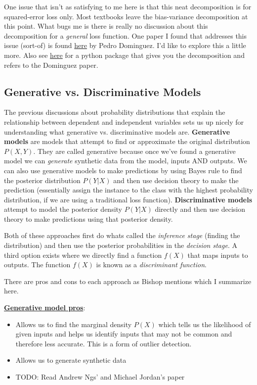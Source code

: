 One issue that isn't as satisfying to me here is that this neat decomposition is for squared-error loss only. Most textbooks leave the bias-variance decomposition at this point. What bugs me is there is really no discussion about this decomposition for a \emph{general} loss function. One paper I found that addresses this issue (sort-of) is found \href{https://homes.cs.washington.edu/~pedrod/bvd.pdf}{here} by Pedro Dominguez. I'd like to explore this a little more. Also see \href{https://github.com/rasbt/mlxtend/blob/master/docs/sources/user_guide/evaluate/bias_variance_decomp.ipynb?utm_campaign=Data_Elixir&utm_source=Data_Elixir_210}{here} for a python package that gives you the decomposition and refers to the Dominguez paper.




\subsection{Generative vs. Discriminative Models}

The previous discussions about probability distributions that explain the relationship between dependent and independent variables sets us up nicely for understanding what generative vs. discriminative models are. \textbf{Generative models} are models that attempt to find or approximate the original distribution $P(X,Y)$. They are called generative because once we've found a generative model we can \emph{generate} synthetic data from the model, inputs AND outputs. We can also use generative models to make predictions by using Bayes rule to find the posterior distribution $P(Y|X)$ and then use decision theory to make the prediction (essentially assign the instance to the class with the highest probability distribution, if we are using a traditional loss function). \textbf{Discriminative models} attempt to model the posterior density $P(Y|X)$ directly and then use decision theory to make predictions using that posterior density. 

Both of these approaches first do whats called the \emph{inference stage} (finding the distribution) and then use the posterior probabilities in the \emph{decision stage}. A third option exists where we directly find a function $f(X)$ that maps inputs to outputs. The function $f(X)$ is known as a \emph{discriminant function}.

There are pros and cons to each approach as Bishop mentions which I summarize here.
\break

\noindent \underline{\textbf{Generative model pros}}:
\begin{itemize}
\item Allows us to find the marginal density $P(X)$ which tells us the likelihood of given inputs and helps us identify inputs that may not be common and therefore less accurate. This is a form of outlier detection.
\item Allows us to generate synthetic data
\item TODO: Read Andrew Ngs' and Michael Jordan's paper
\end{itemize}

